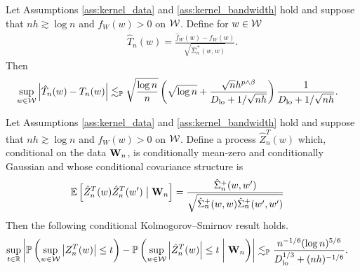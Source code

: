 \begin{lemma}
  \label{lem:studentized_t_statistic}

  Let Assumptions \ref{ass:kernel_data} and
  \ref{ass:kernel_bandwidth} hold and suppose that
  $nh \gtrsim \log n$ and $f_W(w) > 0$ on $\mathcal{W}$.
  Define for $w \in \mathcal{W}$
  \begin{align*}
    \hat T_n(w) = \frac{\hat f_W(w) - f_W(w)}
    {\sqrt{\hat\Sigma_n^+(w,w)}}.
  \end{align*}
  Then
  \begin{align*}
    \sup_{w \in \mathcal{W}}
    \left| \hat T_n(w) - T_n(w) \right|
    &\lesssim_{\mathbb{P}}
    \sqrt{\frac{\log n}{n}}
    \left(
      \sqrt{\log n} + \frac{\sqrt n h^{p \wedge \beta}}
      {D_{\textup{lo}} + 1/\sqrt{nh}}
    \right)
    \frac{1}{D_{\textup{lo}} + 1/\sqrt{nh}}.
  \end{align*}

\end{lemma}

\begin{lemma}
  \label{lem:distributional_approx_feasible_gaussian}

  Let Assumptions \ref{ass:kernel_data} and \ref{ass:kernel_bandwidth}
  hold and suppose that
  $nh \gtrsim \log n$ and $f_W(w) > 0$ on $\mathcal{W}$.
  Define a process $\hat Z_n^T(w)$ which,
  conditional on the data $\mathbf{W}_n$,
  is conditionally mean-zero and
  conditionally Gaussian and whose
  conditional covariance structure is
  \begin{align*}
    \mathbb{E}\left[
      \hat Z_n^T(w) \hat Z_n^T(w')
      \bigm| \mathbf{W}_n \right]
    &=
    \frac{\hat \Sigma_n^+(w,w')}
    {\sqrt{\hat \Sigma_n^+(w,w) \hat \Sigma_n^+(w',w')}}
  \end{align*}
  Then the following conditional
  Kolmogorov--Smirnov result holds.
  \begin{align*}
    \sup_{t \in \mathbb{R}}
    \left|
    \mathbb{P}\left(
      \sup_{w \in \mathcal{W}}
      \left| Z_n^T(w) \right|
      \leq t
    \right)
    - \mathbb{P}\left(
      \sup_{w \in \mathcal{W}}
      \left| \hat Z_n^T(w) \right|
      \leq t
      \biggm\vert \mathbf{W}_n
    \right)
    \right|
    &\lesssim_{\mathbb{P}}
    \frac{n^{-1/6}(\log n)^{5/6}}
    {D_{\textup{lo}}^{1/3} + (nh)^{-1/6}}.
  \end{align*}

\end{lemma}

